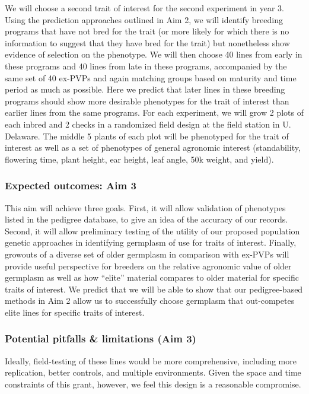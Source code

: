 \documentclass[12pt]{article}
\begin{document}
We will choose a second trait of interest for the second experiment in year 3.  
Using the prediction approaches outlined in Aim 2, we will identify breeding programs that have not bred for the trait (or more likely for which there is no information to suggest that they have bred for the trait) but nonetheless show evidence of selection on the phenotype.  
We will then choose 40 lines from early in these programs and 40 lines from late in these programs, accompanied by the same set of 40 ex-PVPs and again matching groups based on maturity and time period as much as possible.
Here we predict that later lines in these breeding programs should show more desirable phenotypes for the trait of interest than earlier lines from the same programs.  
For each experiment, we will grow 2 plots of each inbred and 2 checks in a randomized field design at the field station in U. Delaware. 
The middle 5 plants of each plot will be phenotyped for the trait of interest as well as a set of phenotypes of general agronomic interest (standability, flowering time, plant height, ear height, leaf angle, 50k weight, and yield).

\subsubsection*{Expected outcomes: Aim 3}
This aim will achieve three goals.
First, it will allow validation of phenotypes listed in the pedigree database, to give an idea of the accuracy of our records.
Second, it will allow preliminary testing of the utility of our proposed population genetic approaches in identifying germplasm of use for traits of interest.
Finally, growouts of a diverse set of older germplasm in comparison with ex-PVPs will provide useful perspective for breeders on the relative agronomic value of older germplasm as well as how ``elite'' material compares to older material for specific traits of interest.
We predict that we will be able to show that our pedigree-based methods in Aim 2 allow us to successfully choose germplasm that out-competes elite lines for specific traits of interest. 

\subsubsection*{Potential pitfalls \& limitations (Aim 3)}

Ideally, field-testing of these lines would be more comprehensive, including more replication, better controls, and multiple environments.
Given the space and time constraints of this grant, however, we feel this design is a  reasonable compromise.
\end{document}
